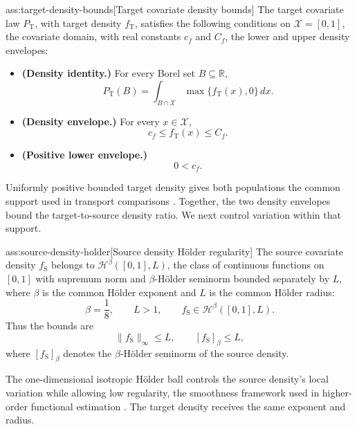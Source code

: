 \documentclass[11pt]{article}
\begin{document}
\begin{assumptionv}{ass:target-density-bounds}[Target covariate density bounds]
The target covariate law \(P_{\mathrm T}\), with target density \(f_{\mathrm T}\), satisfies the following conditions on \(\mathcal X=[0,1]\), the covariate domain, with real constants \(c_f\) and \(C_f\), the lower and upper density envelopes:
\begin{itemize}
\item \textbf{(Density identity.)} For every Borel set \(B\subseteq\mathbb R\),
\[
P_{\mathrm T}(B)=\int_{B\cap\mathcal X}\max\{f_{\mathrm T}(x),0\}\,dx.
\]
\item \textbf{(Density envelope.)} For every \(x\in\mathcal X\),
\[
c_f\le f_{\mathrm T}(x)\le C_f.
\]
\item \textbf{(Positive lower envelope.)}
\[
0<c_f.
\]
\end{itemize}
\end{assumptionv}

Uniformly positive bounded target density gives both populations the common support used in transport comparisons \citep{ZengKennedyBodnarNaimi2025Efficient}. Together, the two density envelopes bound the target-to-source density ratio. We next control variation within that support.

\begin{assumptionv}{ass:source-density-holder}[Source density Hölder regularity]
The source covariate density \(f_{\mathrm S}\) belongs to \(\mathcal H^{\beta}([0,1],L)\), the class of continuous functions on \([0,1]\) with supremum norm and \(\beta\)-Hölder seminorm bounded separately by \(L\), where \(\beta\) is the common Hölder exponent and \(L\) is the common Hölder radius:
\[
\beta=\frac18,\qquad L>1,\qquad
f_{\mathrm S}\in\mathcal H^{\beta}([0,1],L).
\]
Thus the bounds are
\[
\lVert f_{\mathrm S}\rVert_{\infty}\le L,
\qquad
[f_{\mathrm S}]_{\beta}\le L,
\]
where \([f_{\mathrm S}]_{\beta}\) denotes the \(\beta\)-Hölder seminorm of the source density.
\end{assumptionv}

The one-dimensional isotropic Hölder ball controls the source density's local variation while allowing low regularity, the smoothness framework used in higher-order functional estimation \citep{RobinsLiMukherjeeTchetgenVanDerVaart2017HigherOrder}. The target density receives the same exponent and radius.
\end{document}
